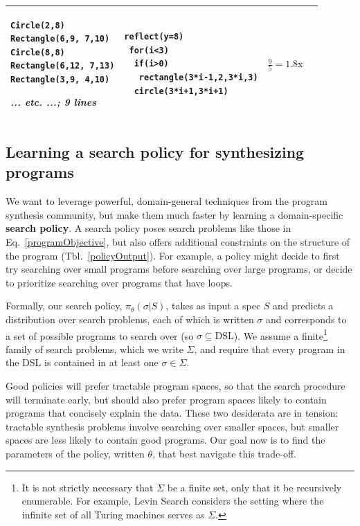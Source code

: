 \documentclass{article}
\theoremstyle{definition}
\begin{document}
\begin{table}[t]
\begin{tabular}{m{1.5cm}llc}
\begin{minipage}{\exampleTraceSize}\begin{lstlisting}
Circle(2,8)
Rectangle(6,9, 7,10)
Circle(8,8)
Rectangle(6,12, 7,13)
Rectangle(3,9, 4,10)
\end{lstlisting}\small\emph{... etc. ...; 9 lines}
  \end{minipage}&\begin{minipage}{\exampleProgramSize}
\begin{lstlisting}
reflect(y=8)
 for(i<3)
  if(i>0)
   rectangle(3*i-1,2,3*i,3)
  circle(3*i+1,3*i+1)
\end{lstlisting}
\end{minipage}&$\frac{9}{5} = 1.8\text{x}$ \\\bottomrule
  \end{tabular}
  \end{table}

\subsection{Learning a search policy for synthesizing programs}\label{learningASearchPolicy}

We want to leverage powerful, domain-general techniques from the program synthesis community,
but make them much faster by
learning a domain-specific \textbf{search policy}.
A search policy poses search problems
like those in Eq.~\ref{programObjective},
but also offers additional constraints on the structure of the program (Tbl.~\ref{policyOutput}).
For example, a policy might decide to first try searching over small programs before searching over large programs,
or decide to prioritize searching over programs that have loops.


Formally, our search policy, $\pi_\theta(\sigma  | S )$, takes as input a spec $S$ and predicts a distribution over search problems, each of which is written $\sigma $ and corresponds to a set of possible programs to search over (so $\sigma \subseteq \text{DSL}$).
We assume a finite\footnote{It is not strictly necessary that $\Sigma$ be a finite set, only that it be recursively enumerable.
For example, Levin Search considers the setting where the infinite set of all Turing machines serves as $\Sigma$.} family of
search problems, which we write $\Sigma$,
and require that every program in the DSL
is contained in at least one $\sigma \in \Sigma$.

Good policies will prefer tractable program spaces,
so that the search procedure will terminate early, 
but should also prefer program spaces likely to contain
programs that concisely explain the data.
These two desiderata are in tension:
tractable synthesis problems involve searching over smaller spaces,
but smaller spaces are less likely to contain good programs.
Our goal now is to find the parameters of the policy, written $\theta$, that best navigate this trade-off.
\end{document}
